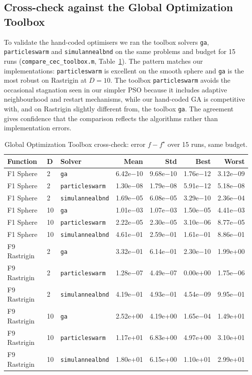 \documentclass[11pt,a4paper]{article}
\begin{document}
\subsection{Cross-check against the Global Optimization Toolbox}
To validate the hand-coded optimisers we ran the toolbox solvers \texttt{ga}, \texttt{particleswarm} and
\texttt{simulannealbnd} on the same problems and budget for 15 runs (\texttt{compare\_cec\_toolbox.m},
Table~\ref{tab:p3tb}). The pattern matches our implementations: \texttt{particleswarm} is excellent on the
smooth sphere and \texttt{ga} is the most robust on Rastrigin at $D=10$. The toolbox \texttt{particleswarm}
avoids the occasional stagnation seen in our simpler PSO because it includes adaptive neighbourhood and
restart mechanisms, while our hand-coded GA is competitive with, and on Rastrigin slightly different from,
the toolbox \texttt{ga}. The agreement gives confidence that the comparison reflects the algorithms rather
than implementation errors.

\begin{table}[h]
  \centering
  \caption{Global Optimization Toolbox cross-check: error $f - f^{\star}$ over 15 runs, same budget.}
  \label{tab:p3tb}
  \footnotesize
  \begin{tabular}{ll l rrrr}
    \toprule
    \textbf{Function} & \textbf{D} & \textbf{Solver} & \textbf{Mean} & \textbf{Std} & \textbf{Best} & \textbf{Worst} \\
    \midrule
    F1 Sphere    & 2  & \texttt{ga}             & 6.42e$-$10 & 9.68e$-$10 & 1.76e$-$12 & 3.12e$-$09 \\
    F1 Sphere    & 2  & \texttt{particleswarm}  & 1.30e$-$08 & 1.79e$-$08 & 5.91e$-$12 & 5.18e$-$08 \\
    F1 Sphere    & 2  & \texttt{simulannealbnd} & 1.69e$-$05 & 6.08e$-$05 & 3.29e$-$10 & 2.36e$-$04 \\
    \midrule
    F1 Sphere    & 10 & \texttt{ga}             & 1.01e$-$03 & 1.07e$-$03 & 1.50e$-$05 & 4.41e$-$03 \\
    F1 Sphere    & 10 & \texttt{particleswarm}  & 2.22e$-$05 & 2.30e$-$05 & 3.10e$-$06 & 8.77e$-$05 \\
    F1 Sphere    & 10 & \texttt{simulannealbnd} & 4.61e$-$01 & 2.59e$-$01 & 1.61e$-$01 & 8.86e$-$01 \\
    \midrule
    F9 Rastrigin & 2  & \texttt{ga}             & 3.32e$-$01 & 6.14e$-$01 & 2.30e$-$10 & 1.99e+00 \\
    F9 Rastrigin & 2  & \texttt{particleswarm}  & 1.28e$-$07 & 4.49e$-$07 & 0.00e+00 & 1.75e$-$06 \\
    F9 Rastrigin & 2  & \texttt{simulannealbnd} & 4.19e$-$01 & 4.93e$-$01 & 4.54e$-$09 & 9.95e$-$01 \\
    \midrule
    F9 Rastrigin & 10 & \texttt{ga}             & 2.52e+00 & 4.19e+00 & 1.65e$-$04 & 1.49e+01 \\
    F9 Rastrigin & 10 & \texttt{particleswarm}  & 1.17e+01 & 6.83e+00 & 4.97e+00 & 3.10e+01 \\
    F9 Rastrigin & 10 & \texttt{simulannealbnd} & 1.80e+01 & 6.15e+00 & 1.10e+01 & 2.99e+01 \\
    \bottomrule
  \end{tabular}
\end{table}
\end{document}
